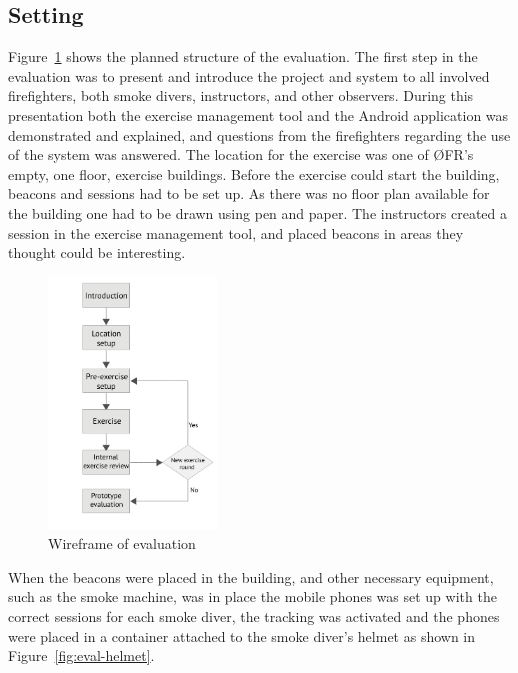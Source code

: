 \documentclass[../Main/thesis.tex]{subfiles}
\begin{document}
\subsection{Setting}
Figure~\ref{fig:eval-wireframe} shows the planned structure of the evaluation.
The first step in the evaluation was to present and introduce the project and system to all involved firefighters, both smoke divers, instructors, and other observers.
During this presentation both the exercise management tool and the Android application was demonstrated and explained, and questions from the firefighters regarding the use of the system was answered.
The location for the exercise was one of ØFR's empty, one floor, exercise buildings.
Before the exercise could start the building, beacons and sessions had to be set up.
As there was no floor plan available for the building one had to be drawn using pen and paper.
The instructors created a session in the exercise management tool, and placed beacons in areas they thought could be interesting.

\begin{figure}[h]
	\centering
	\includegraphics[width=0.4\textwidth]{../fig/eval_wireframe}
	\caption{Wireframe of evaluation}
	\label{fig:eval-wireframe}
\end{figure}

When the beacons were placed in the building, and other necessary equipment, such as the smoke machine, was in place the mobile phones was set up with the correct sessions for each smoke diver, the tracking was activated and the phones were placed in a container attached to the smoke diver's helmet as shown in Figure~\ref{fig:eval-helmet}.
\end{document}
